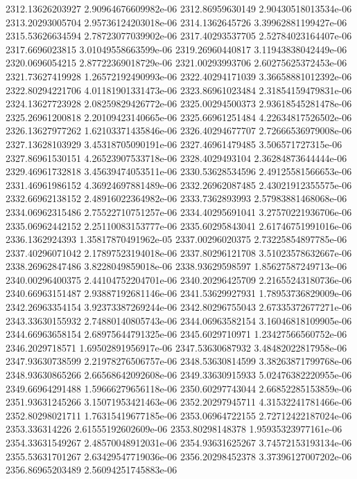{2312.13626203927 2.90964676609982e-06
2312.86959630149 2.90430518013534e-06
2313.20293005704 2.95736124203018e-06
2314.1362645726 3.39962881199427e-06
2315.53626634594 2.78723077039902e-06
2317.40293537705 2.52784023164407e-06
2317.6696023815 3.01049558663599e-06
2319.26960440817 3.11943838042449e-06
2320.0696054215 2.87722369018729e-06
2321.00293993706 2.60275625372453e-06
2321.73627419928 1.26572192490993e-06
2322.40294171039 3.36658881012392e-06
2322.80294221706 4.01181901331473e-06
2323.86961023484 2.31854159479831e-06
2324.13627723928 2.08259829426772e-06
2325.00294500373 2.93618545281478e-06
2325.26961200818 2.20109423140665e-06
2325.66961251484 4.22634817526502e-06
2326.13627977262 1.62103371435846e-06
2326.40294677707 2.72666536979008e-06
2327.13628103929 3.45318705090191e-06
2327.46961479485 3.506571727315e-06
2327.86961530151 4.26523907533718e-06
2328.4029493104 2.36284873644444e-06
2329.46961732818 3.45639474053511e-06
2330.53628534596 2.49125581566653e-06
2331.46961986152 4.36924697881489e-06
2332.26962087485 2.43021912355575e-06
2332.66962138152 2.48916022364982e-06
2333.7362893993 2.57983881468068e-06
2334.06962315486 2.75522710751257e-06
2334.40295691041 3.27570221936706e-06
2335.06962442152 2.25110083153777e-06
2335.60295843041 2.61746751991016e-06
2336.1362924393 1.35817870491962e-05
2337.00296020375 2.73225854897785e-06
2337.40296071042 2.17897523194018e-06
2337.80296121708 3.51023578632667e-06
2338.26962847486 3.8228049859018e-06
2338.93629598597 1.85627587249713e-06
2340.00296400375 2.44104752204701e-06
2340.20296425709 2.21655243180736e-06
2340.66963151487 2.93887192681146e-06
2341.53629927931 1.78953736829009e-06
2342.26963354154 3.92373387269244e-06
2342.80296755043 2.67335372677271e-06
2343.33630155932 2.74880140805743e-06
2344.06963582154 3.16046818109905e-06
2344.66963658154 2.68975644791325e-06
2345.6029710971 1.23427566560752e-06
2346.2029718571 1.69502891956917e-06
2347.53630687932 3.48482022817958e-06
2347.93630738599 2.21978276506757e-06
2348.53630814599 3.38263871799768e-06
2348.93630865266 2.66568642092608e-06
2349.33630915933 5.02476382220955e-06
2349.66964291488 1.59666279656118e-06
2350.60297743044 2.66852285153859e-06
2351.93631245266 3.15071953421463e-06
2352.20297945711 4.31532241781466e-06
2352.80298021711 1.76315419677185e-06
2353.06964722155 2.72712422187024e-06
2353.336314226 2.61555192602609e-06
2353.80298148378 1.95935323977161e-06
2354.33631549267 2.48570048912031e-06
2354.93631625267 3.74572153193134e-06
2355.53631701267 2.63429547719036e-06
2356.20298452378 3.37396127007202e-06
2356.86965203489 2.56094251745883e-06
}
